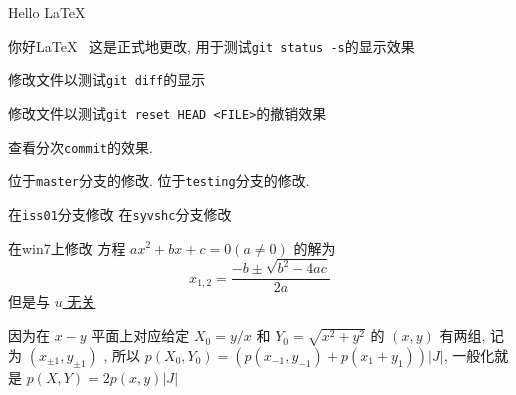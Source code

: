 \documentclass{ctexart}
\begin{document}
	Hello \LaTeX~

	你好\LaTeX~ %
	这是正式地更改, 用于测试\verb|git status -s|的显示效果

	修改文件以测试\verb|git diff|的显示

	修改文件以测试\verb|git reset HEAD <FILE>|的撤销效果

	查看分次\verb|commit|的效果. 

	位于\verb|master|分支的修改. 
	位于\verb|testing|分支的修改. 
	
	在\verb|iss01|分支修改
	在\verb|syvshc|分支修改

	在win7上修改
	方程 $ ax^{2}+bx+c=0(a\ne 0) $ 的解为
	\[
		x_{1, 2}=\frac{-b\pm\sqrt{b^{2}-4ac}}{2a}
	\]
	但是与 \uline{$ u $ 无关}

	因为在 $ x-y $ 平面上对应给定 $ X_{0}=y/x $ 和 $ Y_{0}=\sqrt{x^{2}+y^{2}} $ 的 $ (x, y) $ 有两组, 记为 $ (x_{\pm1}, y_{\pm1}) $ , 所以 $ p(X_{0}, Y_{0})=(p(x_{-1}, y_{-1})+p(x_{1}+y_{1}))|J| $, 一般化就是 $ p(X, Y)=2p(x, y)|J| $
\end{document}
